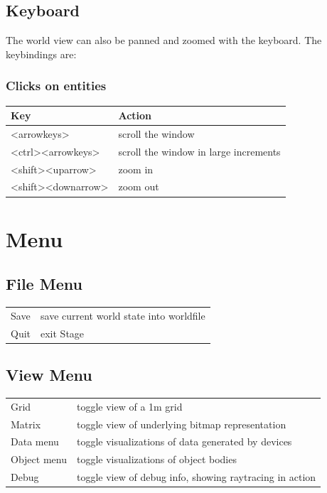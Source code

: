 \documentclass[letter,11pt,twoside]{report}
\begin{document}
\subsection{Keyboard}
The world view can also be panned and zoomed with the keyboard. The
keybindings are:

\subsubsection*{Clicks on entities}
\begin{tabular}{|l|l|}
\hline Key & Action\\ \hline
<arrowkeys>        & scroll the window \\
<ctrl><arrowkeys>  & scroll the window in large increments \\
<shift><uparrow>   & zoom in \\
<shift><downarrow> & zoom out \\
\hline 
\end{tabular}

\section{Menu}

\subsection{File Menu}

\begin{tabular}{|l|l|}
\hline 
Save & save current world state into worldfile\\
Quit & exit Stage\\
\hline
\end{tabular}

\subsection{View Menu}

\begin{tabular}{|l|l|}
\hline 
Grid & toggle view of a 1m grid\\
Matrix & toggle view of underlying bitmap representation\\
Data menu & toggle visualizations of data generated by devices\\
Object menu & toggle visualizations of object bodies\\
Debug & toggle view of debug info, showing raytracing in action\\
\hline
\end{tabular}
\end{document}
